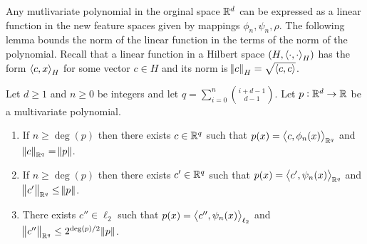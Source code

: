 Any mutlivariate polynomial in the orginal space $\mathbb{R}^d$ can be expressed as a
linear function in the new feature spaces given by mappings $\phi_n, \psi_n,
\rho$. The following lemma bounds the norm of the linear function in the terms
of the norm of the polynomial. Recall that a linear function in a Hilbert space
$(H, \left\langle \cdot, \cdot \right\rangle_H)$ has the form $\left\langle c, x \right\rangle_H$ for some vector $c \in H$
and its norm is $\norm{c}_H = \sqrt{\left\langle c, c \right\rangle}$.

\begin{lemma}
Let $d \ge 1$ and $n \ge 0$ be integers and let $q = \sum_{i=0}^n \binom{i+d-1}{d-1}$.
Let $p:\mathbb{R}^d \to \mathbb{R}$ be a multivariate polynomial.
\begin{enumerate}
\item If $n \ge \deg(p)$ then there exists $c \in \mathbb{R}^q$ such that $p(x) = \left\langle c, \phi_n(x) \right\rangle_{\mathbb{R}^q}$
and $\norm{c}_{\mathbb{R}^q} = \norm{p}$.
\item If $n \ge \deg(p)$ then there exists $c' \in \mathbb{R}^q$ such that $p(x) = \left\langle c', \psi_n(x) \right\rangle_{\mathbb{R}^q}$
and $\norm{c'}_{\mathbb{R}^q} \le \norm{p}$.
\item There exists $c'' \in \ell_2$ such that $p(x) = \left\langle c'', \psi_n(x) \right\rangle_{\ell_2}$
and $\norm{c''}_{\mathbb{R}^q} \le 2^{\deg(p)/2} \norm{p}$.
\end{enumerate}
\end{lemma}

